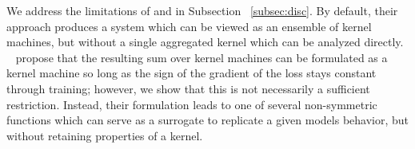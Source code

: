 We address the limitations of \citet{domingos2020} and \citet{chen2021equivalence} in Subsection %
~\ref{subsec:disc}. By default, their approach produces a system which can be viewed as an ensemble of kernel machines, but without a single aggregated kernel which can be analyzed directly. ~\citet{chen2021equivalence} propose that the resulting sum over kernel machines can be formulated as a kernel machine so long as the sign of the gradient of the loss stays constant through training; however, we show that this is not necessarily a sufficient restriction. Instead, their formulation leads to one of several non-symmetric functions which can serve as a surrogate to replicate a given models behavior, but without retaining properties of a kernel.








